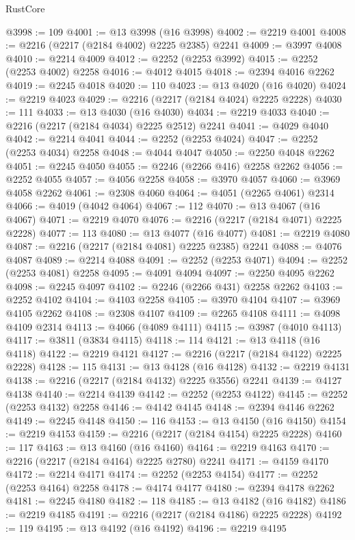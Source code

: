 \begin{lexlean}{RustCore}
\begin{coremodule}
@3998 := 109
@4001 := @13 @3998 (@16 @3998)
@4002 := @2219 @4001
@4008 := @2216 (@2217 (@2184 @4002) @2225 @2385) @2241
@4009 := @3997 @4008
@4010 := @2214 @4009
@4012 := @2252 (@2253 @3992)
@4015 := @2252 (@2253 @4002) @2258
@4016 := @4012 @4015
@4018 := @2394 @4016 @2262
@4019 := @2245 @4018
@4020 := 110
@4023 := @13 @4020 (@16 @4020)
@4024 := @2219 @4023
@4029 := @2216 (@2217 (@2184 @4024) @2225 @2228)
@4030 := 111
@4033 := @13 @4030 (@16 @4030)
@4034 := @2219 @4033
@4040 := @2216 (@2217 (@2184 @4034) @2225 @2512) @2241
@4041 := @4029 @4040
@4042 := @2214 @4041
@4044 := @2252 (@2253 @4024)
@4047 := @2252 (@2253 @4034) @2258
@4048 := @4044 @4047
@4050 := @2250 @4048 @2262
@4051 := @2245 @4050
@4055 := @2246 (@2266 @416) @2258 @2262
@4056 := @2252 @4055
@4057 := @4056 @2258
@4058 := @3970 @4057
@4060 := @3969 @4058 @2262
@4061 := @2308 @4060
@4064 := @4051 (@2265 @4061) @2314
@4066 := @4019 (@4042 @4064)
@4067 := 112
@4070 := @13 @4067 (@16 @4067)
@4071 := @2219 @4070
@4076 := @2216 (@2217 (@2184 @4071) @2225 @2228)
@4077 := 113
@4080 := @13 @4077 (@16 @4077)
@4081 := @2219 @4080
@4087 := @2216 (@2217 (@2184 @4081) @2225 @2385) @2241
@4088 := @4076 @4087
@4089 := @2214 @4088
@4091 := @2252 (@2253 @4071)
@4094 := @2252 (@2253 @4081) @2258
@4095 := @4091 @4094
@4097 := @2250 @4095 @2262
@4098 := @2245 @4097
@4102 := @2246 (@2266 @431) @2258 @2262
@4103 := @2252 @4102
@4104 := @4103 @2258
@4105 := @3970 @4104
@4107 := @3969 @4105 @2262
@4108 := @2308 @4107
@4109 := @2265 @4108
@4111 := @4098 @4109 @2314
@4113 := @4066 (@4089 @4111)
@4115 := @3987 (@4010 @4113)
@4117 := @3811 (@3834 @4115)
@4118 := 114
@4121 := @13 @4118 (@16 @4118)
@4122 := @2219 @4121
@4127 := @2216 (@2217 (@2184 @4122) @2225 @2228)
@4128 := 115
@4131 := @13 @4128 (@16 @4128)
@4132 := @2219 @4131
@4138 := @2216 (@2217 (@2184 @4132) @2225 @3556) @2241
@4139 := @4127 @4138
@4140 := @2214 @4139
@4142 := @2252 (@2253 @4122)
@4145 := @2252 (@2253 @4132) @2258
@4146 := @4142 @4145
@4148 := @2394 @4146 @2262
@4149 := @2245 @4148
@4150 := 116
@4153 := @13 @4150 (@16 @4150)
@4154 := @2219 @4153
@4159 := @2216 (@2217 (@2184 @4154) @2225 @2228)
@4160 := 117
@4163 := @13 @4160 (@16 @4160)
@4164 := @2219 @4163
@4170 := @2216 (@2217 (@2184 @4164) @2225 @2780) @2241
@4171 := @4159 @4170
@4172 := @2214 @4171
@4174 := @2252 (@2253 @4154)
@4177 := @2252 (@2253 @4164) @2258
@4178 := @4174 @4177
@4180 := @2394 @4178 @2262
@4181 := @2245 @4180
@4182 := 118
@4185 := @13 @4182 (@16 @4182)
@4186 := @2219 @4185
@4191 := @2216 (@2217 (@2184 @4186) @2225 @2228)
@4192 := 119
@4195 := @13 @4192 (@16 @4192)
@4196 := @2219 @4195

\end{coremodule}
\end{lexlean}

